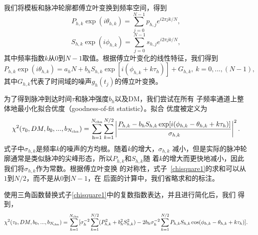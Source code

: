 我们将模板和脉冲轮廓都傅立叶变换到频率空间，得到
\begin{equation}
P_{h,k}\exp(i\theta_{h,k})=\sum_{j=0}^{N-1}p_{h,j}e^{i2\pi jk/N},
\end{equation}
\begin{equation}
S_{h,k}\exp(i\phi_{h,k})=\sum_{j=0}^{N-1}s_{h,j}e^{i2\pi jk/N},
\end{equation}
%
其中频率指数$k$从0到$N-1$取值。根据傅立叶变化的线性特征，我们得到
%
\begin{equation}
\label{eq1}
P_{h,k}\exp(i\theta_{h,k})=a_{h}N+b_{h}S_{h,k}\exp[i(\phi_{h,k}+k\tau_{h})]+G_{h,k},
\ k=0,...,(N-1),
\end{equation}
%
其中$G_{h,k}$代表了时间域的噪声$g_{h}(t_j)$的傅立叶变换。

为了得到脉冲到达时间$\tau$和脉冲强度$b_{h}$以及DM，我们尝试在所有
子频率通道上整体地最小化拟合优度（goodness-of-fit statistic）。拟合
优度被定义为
\begin{equation}
\label{chisquare1}
\chi^{2}(\tau_{0},DM,b_{0},...,b_{N_{\rm{chn}}})=\sum_{\rm{h}=1}^{N_{\rm{chn}}}\sum_{k=1}^{N/2}\left|\frac{P_{h,k}-b_{h}S_{h,k}\exp[i(\phi_{h,k}-\theta_{h,k}+k\tau_{h})]}{\sigma_{h,k}}\right|^2.
\end{equation}
%
式子中$\sigma_{h,k}$是频率$k$的噪声的方均根。随着$k$的增大，$\sigma_{h,k}$
减小，但是实际的脉冲轮廓通常是类似脉冲的尖峰形态，所以$P_{h,k}$和$S_{h,k}$随
着$k$的增大而更快地减小，因此我们将$\sigma_{h,k}$作为常数。根据傅立叶变换
的对称性，式子~\ref{chisquare1}的求和可以从$1$到$N/2$，而不是从0到$N-1$，在
后面的计算中，我们省略求和的标注。

使用三角函数替换式子\ref{chisquare1}中的复数指数表达，并且进行简化后，我们
得到，
\begin{equation}
\label{chisquare2}
\chi^{2}(\tau_{0},DM,b_{0},...,b_{N_{\rm{chn}}})=\sum_{h=1}^{N_{\rm{chn}}}[\sigma_{h}^{-2}\sum_{k=1}^{N/2}(P_{h,k}^2+b_{h}^{2}S_{h,k}^2)-2b_{h}\sigma_{h}^{-2}\sum_{k=1}^{N/2}P_{h,k}S_{h,k}\cos(\phi_{h,k}-\theta_{h,k}+k\tau_{h})].
\end{equation}

